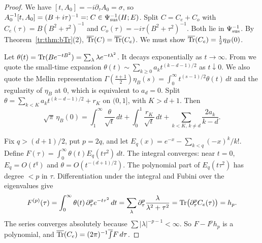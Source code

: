 \begin{proof}
We have \([t,A_0]=-i\partial_\tau A_0=\sigma\), so
\(A_0^{-1}[t,A_0]=(B+i\tau)^{-1}=:C\in\Psi_{\mathrm{sus}}^{-1}(H;E)\). Split
\(C=C_e+C_o\) with \(C_e(\tau)=B(B^2+\tau^2)^{-1}\) and
\(C_o(\tau)=-i\tau(B^2+\tau^2)^{-1}\). Both lie in \(\Psi_{\mathrm{sus}}^{-1}\). By
Theorem~\ref{tr:thm:bTr}(2), \(\overline{\operatorname{Tr}}(C)=\overline{\operatorname{Tr}}(C_e)\). We must show
\(\overline{\operatorname{Tr}}(C_e)=\frac12\eta_B(0)\).

Let \(\theta(t)=\operatorname{Tr}(Be^{-tB^2})=\sum_\lambda\lambda e^{-t\lambda^2}\). It
decays exponentially as \(t\to\infty\). From \cite[Section ``The eta invariant'']{Notes}
we quote the small-time expansion \(\theta(t)\sim\sum_{k\ge0}a_kt^{(k-d-1)/2}\)
as \(t\downarrow0\). We also quote the Mellin representation
\(\Gamma(\frac{s+1}2)\eta_B(s)=\int_0^\infty t^{(s-1)/2}\theta(t)\,dt\)
and the regularity of \(\eta_B\) at \(0\), which is equivalent to \(a_d=0\).
Split \(\theta=\sum_{k<K}a_kt^{(k-d-1)/2}+r_K\) on \((0,1]\), with
\(K>d+1\). Then
\begin{equation}\label{tr:eq:etaMellin}
 \sqrt\pi\,\eta_B(0)=\int_1^\infty\frac{\theta}{\sqrt t}\,dt+\int_0^1
 \frac{r_K}{\sqrt t}\,dt+\sum_{k<K,\,k\ne d}\frac{2a_k}{k-d}.
\end{equation}

Fix \(q>(d+1)/2\), put \(p=2q\), and let
\(E_q(x)=e^{-x}-\sum_{k<q}(-x)^k/k!\). Define
\(F(\tau)=\int_0^\infty\theta(t)E_q(t\tau^2)\,dt\). The integral converges:
near \(t=0\), \(E_q=O(t^q)\) and \(\theta=O(t^{-(d+1)/2})\). The polynomial
part of \(E_q(t\tau^2)\) has degree \(<p\) in \(\tau\). Differentiation
under the integral and Fubini over the eigenvalues give
\[
 F^{(p)}(\tau)=\int_0^\infty\theta(t)\,\partial_\tau^pe^{-t\tau^2}\,dt=
 \sum_\lambda\partial_\tau^p\frac{\lambda}{\lambda^2+\tau^2}=\operatorname{Tr}\bigl(\partial
 _\tau^pC_e(\tau)\bigr)=h_p .
\]
The series converges absolutely because \(\sum|\lambda|^{-p-1}<\infty\). So
\(F-I^ph_p\) is a polynomial, and \(\overline{\operatorname{Tr}}(C_e)=(2\pi)^{-1}\overline{\int} F\,d\tau\).


\end{proof}
